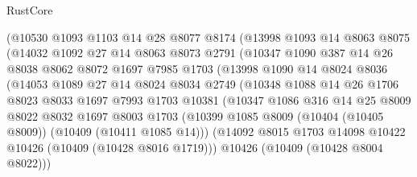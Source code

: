 \begin{lexlean}{RustCore}
\begin{coremodule}
                (@10530
                  @1093
                  @1103
                  @14
                  @28
                  @8077
                  @8174
                  (@13998
                    @1093
                    @14
                    @8063
                    @8075
                    (@14032
                      @1092
                      @27
                      @14
                      @8063
                      @8073
                      @2791
                      (@10347
                        @1090
                        @387
                        @14
                        @26
                        @8038
                        @8062
                        @8072
                        @1697
                        @7985
                        @1703
                        (@13998
                          @1090
                          @14
                          @8024
                          @8036
                          (@14053
                            @1089
                            @27
                            @14
                            @8024
                            @8034
                            @2749
                            (@10348
                              @1088
                              @14
                              @26
                              @1706
                              @8023
                              @8033
                              @1697
                              @7993
                              @1703
                              @10381
                              (@10347
                                @1086
                                @316
                                @14
                                @25
                                @8009
                                @8022
                                @8032
                                @1697
                                @8003
                                @1703
                                (@10399
                                  @1085
                                  @8009
                                  (@10404 (@10405 @8009))
                                  (@10409 (@10411 @1085 @14)))
                                (@14092
                                  @8015
                                  @1703
                                  @14098
                                  @10422
                                  @10426
                                  (@10409 (@10428 @8016 @1719)))
                                @10426
                                (@10409 (@10428 @8004 @8022)))

\end{coremodule}
\end{lexlean}
